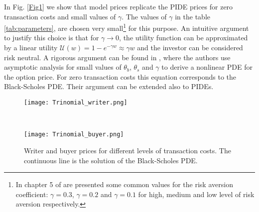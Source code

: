 In Fig. \ref{Fig1} we show that model prices replicate the PIDE prices for zero transaction costs and small values of $\gamma$. 
The values of $\gamma$ in the table \ref{tab:parameters},
are chosen very small\footnote{ In chapter 5 of \cite{GK99} are presented some common values for the risk aversion coefficient: $\gamma=0.3$, $\gamma=0.2$ and $\gamma=0.1$ 
for high, medium and low level of risk aversion respectively.} for this purpose. 
An intuitive argument to justify this choice is that for $\gamma \to 0$, the utility function 
can be approximated by a linear utility $\mathcal{U}(w) = 1 - e^{-\gamma w} \approx \gamma w$ and the investor can be considered risk neutral. 
A rigorous argument can be found in \cite{BaSo98}, where the authors use asymptotic analysis for small values of $\theta_b$, $\theta_s$ and $\gamma$ to derive 
a nonlinear PDE for the option price. For zero transaction costs this equation corresponds to the Black-Scholes PDE. 
Their argument can be extended also to PIDEs.
\begin{figure}[t!]
 \begin{minipage}[b]{0.5\linewidth}
   \centering
   \texttt{[image: Trinomial\_writer.png]}
 \end{minipage}
 \ \hspace{2mm} \hspace{3mm} \
 \begin{minipage}[b]{0.5\linewidth}
  \centering
   \texttt{[image: Trinomial\_buyer.png]}
 \end{minipage}
    \caption{Writer and buyer prices for different levels of transaction costs. The continuous line is the solution of the Black-Scholes PDE.}
   \label{Fig2}
\end{figure}

